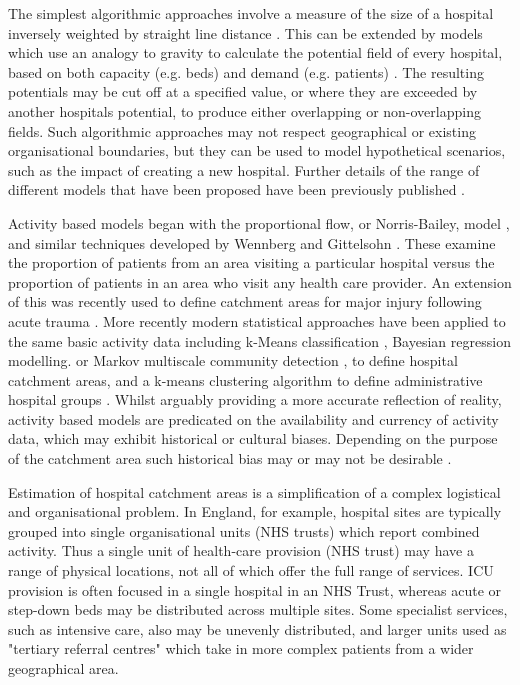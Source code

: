 \documentclass[twocolumn]{bmcart}%
\begin{document}
The simplest algorithmic approaches involve a measure of the size of a hospital inversely weighted by straight line 
distance \cite{reillyLawRetailGravitation1931}. This can be extended by models which use an analogy to gravity to 
calculate the potential field of every hospital, based on both capacity (e.g. beds) and demand (e.g. patients) 
\cite{huffDefiningEstimatingTrading1964,reillyLawRetailGravitation1931,stewartInverseDistanceVariation1941}. The 
resulting potentials may be cut off at a specified value, or where they are exceeded by another hospitals potential, to 
produce either overlapping or non-overlapping fields. Such algorithmic approaches may not respect geographical or 
existing organisational boundaries, but they can be used to model hypothetical scenarios, such as the impact of 
creating a new hospital. Further details of the range of different models that have been proposed have been previously 
published \cite{jonesModellingCatchmentAreas2011;@gilmourIdentificationHospitalCatchment2010}. 

Activity based models began with the proportional flow, or Norris-Bailey, model 
\cite{baileyStatisticsHospitalPlanning1956,norrisRoleStatisticsRegional1952}, and similar techniques developed by 
Wennberg and Gittelsohn \cite{wennbergSmallAreaVariations1973a}. These examine the proportion of patients from an area 
visiting a particular hospital versus the proportion of patients in an area who visit any health care provider. An 
extension of this was recently used to define catchment areas for major injury following acute trauma 
\cite{alexandrescuProposedApproachDefining2008}. More recently modern statistical approaches have been applied to the 
same basic activity data including k-Means classification \cite{gilmourIdentificationHospitalCatchment2010}, Bayesian 
regression modelling. \cite{wangCatchmentAreaAnalysis2015} or Markov multiscale community detection 
\cite{clarkeDefiningHospitalCatchment2019,clarkeIdentifyingNaturallyOccurring2020}, to define hospital catchment areas, 
and a k-means clustering algorithm to define administrative hospital groups \cite{delamaterRegionalHealthCare2013}. 
Whilst arguably providing a more accurate reflection of reality, activity based models are predicated on the 
availability and currency of activity data, which may exhibit historical or cultural biases. Depending on the purpose of 
the catchment area such historical bias may or may not be desirable \cite{gilmourIdentificationHospitalCatchment2010}.

Estimation of hospital catchment areas is a simplification of a complex logistical and organisational problem. In 
England, for example, hospital sites are typically grouped into single organisational units (NHS trusts) which report 
combined activity. Thus a single unit of health-care provision (NHS trust) may have a range of physical locations, not 
all of which offer the full range of services. ICU provision is often focused in a single hospital in an NHS Trust, 
whereas acute or step-down beds may be distributed across multiple sites. Some specialist services, such as intensive 
care, also may be unevenly distributed, and larger units used as "tertiary referral centres" which take in more complex 
patients from a wider geographical area.
\end{document}

